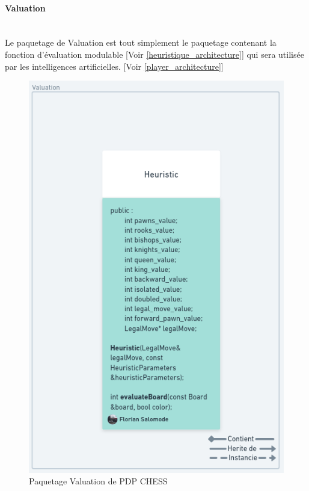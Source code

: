 \documentclass{article}
\begin{document}
\paragraph{Valuation}
~~\\
\newline
Le paquetage de Valuation est tout simplement le paquetage contenant la fonction d'évaluation modulable [Voir \ref{heuristique_architecture}]
qui sera utilisée par les intelligences artificielles. [Voir \ref{player_architecture}]
\begin{figure}[!h]
    \centering
    \includegraphics[scale = 0.2]{img/Package/Valuation.png}
    \caption{Paquetage Valuation de PDP CHESS}
    \label{pck:valuation}
\end{figure}
\end{document}
